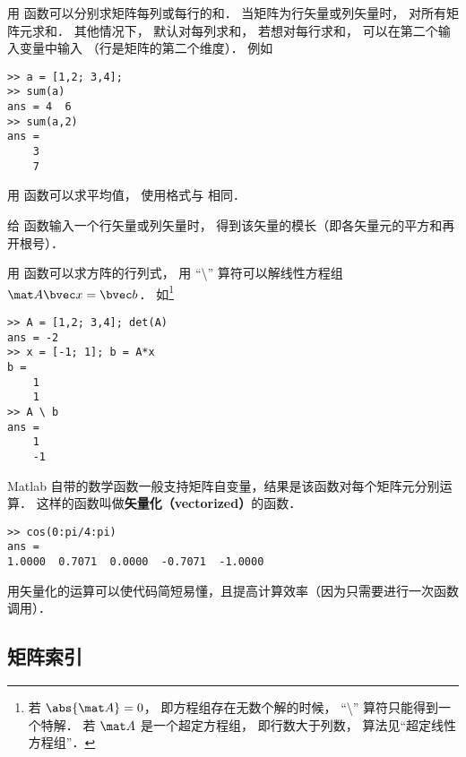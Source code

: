用  函数可以分别求矩阵每列或每行的和． 当矩阵为行矢量或列矢量时，  对所有矩阵元求和． 其他情况下，  默认对每列求和， 若想对每行求和， 可以在第二个输入变量中输入  （行是矩阵的第二个维度）． 例如
\begin{lstlisting}[language=MatlabCom]
>> a = [1,2; 3,4];
>> sum(a)
ans = 4  6
>> sum(a,2)
ans =
    3
    7
\end{lstlisting}
用  函数可以求平均值， 使用格式与  相同．

给  函数输入一个行矢量或列矢量时， 得到该矢量的模长（即各矢量元的平方和再开根号）． 

用  函数可以求方阵的行列式， 用 “\textbackslash” 算符可以解线性方程组%
 $\mat A \bvec x = \bvec b$． 如\footnote{若 $\abs{\mat A} = 0$， 即方程组存在无数个解的时候， “\textbackslash” 算符只能得到一个特解． 若 $\mat A$ 是一个超定方程组， 即行数大于列数， 算法见“超定线性方程组”．}
\begin{lstlisting}[language=MatlabCom]
>> A = [1,2; 3,4]; det(A)
ans = -2
>> x = [-1; 1]; b = A*x
b =
    1
    1
>> A \ b
ans =
    1
    -1
\end{lstlisting}

Matlab 自带的数学函数一般支持矩阵自变量，结果是该函数对每个矩阵元分别运算． 这样的函数叫做\textbf{矢量化（vectorized）}的函数．
\begin{lstlisting}[language=MatlabCom]
>> cos(0:pi/4:pi)
ans =
1.0000  0.7071  0.0000  -0.7071  -1.0000
\end{lstlisting}
用矢量化的运算可以使代码简短易懂，且提高计算效率（因为只需要进行一次函数调用）．

\subsection{矩阵索引}


